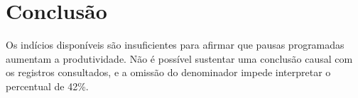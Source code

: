 \section{Conclusão}
Os indícios disponíveis são insuficientes para afirmar que pausas programadas aumentam a produtividade.
Não é possível sustentar uma conclusão causal com os registros consultados, e a omissão do denominador impede interpretar o percentual de 42\%.
